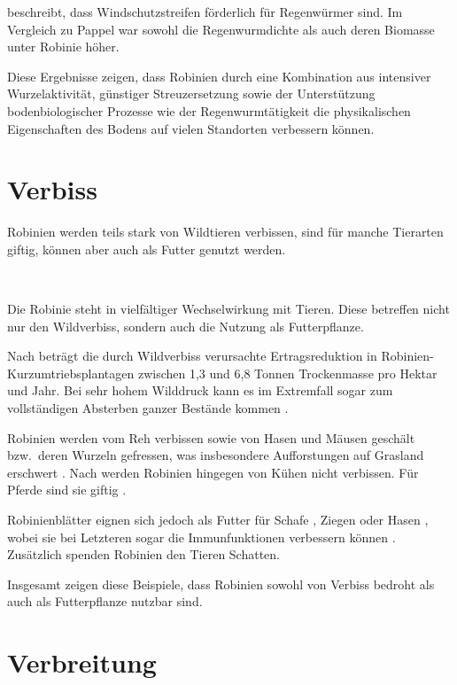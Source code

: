 \documentclass[twocolumn]{scrartcl}
\makeatletter
\newcommand{\summary}[1]{%
  \par %
  {\small\sffamily
    \noindent #1\par}
  \vspace{-0.4em}
  \noindent\makebox[\linewidth]{\rule{0.33\linewidth}{0.4pt}}\\[-1.2em]
  \@afterindentfalse\@afterheading
}
\makeatother
\begin{document}
\citet{vaupel2023robinie} beschreibt, dass Windschutzstreifen förderlich für Regenwürmer sind. Im Vergleich zu Pappel war sowohl die Regenwurmdichte als auch deren Biomasse unter Robinie höher.

Diese Ergebnisse zeigen, dass Robinien durch eine Kombination aus intensiver Wurzelaktivität, günstiger Streuzersetzung sowie der Unterstützung bodenbiologischer Prozesse wie der Regenwurmtätigkeit die physikalischen Eigenschaften des Bodens auf vielen Standorten verbessern können.


\section{Verbiss}

\summary{Robinien werden teils stark von Wildtieren verbissen, sind
  für manche Tierarten giftig, können aber auch als Futter genutzt
  werden.}

Die Robinie steht in vielfältiger Wechselwirkung mit Tieren. Diese betreffen nicht nur den Wildverbiss, sondern auch die Nutzung als Futterpflanze.

Nach \citet{landgraf2014immenser} beträgt die durch Wildverbiss verursachte Ertragsreduktion in Robinien-Kurzumtriebsplantagen zwischen 1{,}3 und 6{,}8 Tonnen Trockenmasse pro Hektar und Jahr. Bei sehr hohem Wilddruck kann es im Extremfall sogar zum vollständigen Absterben ganzer Bestände kommen \citep{landgraf2024robinie1,landgraf2024robinie2}.

Robinien werden vom Reh verbissen sowie von Hasen und Mäusen geschält bzw.\ deren Wurzeln gefressen, was insbesondere Aufforstungen auf Grasland erschwert \citep{barta2023robinieReh}. Nach \citet{berner2018robinie} werden Robinien hingegen von Kühen nicht verbissen. Für Pferde sind sie giftig \citep{grosche2008robiniePferd}.

Robinienblätter eignen sich jedoch als Futter für Schafe \citep{ganai2009robnieSchaf}, Ziegen \citep{papachristou1999robinieZiege} oder Hasen \citep{singh2010robnieHasennahrung}, wobei sie bei Letzteren sogar die Immunfunktionen verbessern können \citep{yang2017robinieHasen}. Zusätzlich spenden Robinien den Tieren Schatten.

Insgesamt zeigen diese Beispiele, dass Robinien sowohl von Verbiss bedroht als auch als Futterpflanze nutzbar sind.



\section{Verbreitung}
\end{document}
